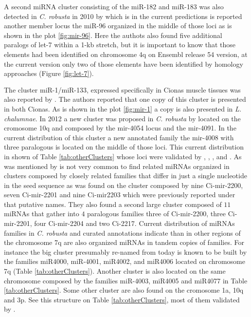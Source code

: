 \documentclass[graybox]{svmult}
\begin{document}
A second miRNA cluster consisting of the miR-182 and miR-183 was also detected 
in \textit{C. robusta} in 2010 by \cite{Keshavan2010} which is in the 
current predictions is reported another member locus the miR-96 organized in 
the 
middle of those loci as is shown in the plot \ref{fig:mir-96}. 
Here the authots also found five additional paralogs of let-7 within a 1-kb 
stretch, but it is important to know that those elements had been identified on 
chromosome 4q on Ensembl release 54 version, at the current version only 
two of those elements have been identified by homology approaches (Figure 
\ref{fig:let-7}).

The cluster miR-1/miR-133, expressed specifically in Cionas muscle tissues was 
also reported by \cite{Kusakabe2013}. The authors reported that one copy of 
this cluster is presented in both Cionas. As is shown in the plot 
\ref{fig:mir-1} a copy is also presented in \textit{L. chalumnae}. In 2012 a 
new cluster was proposed in \textit{C. robusta} by \cite{Terai2012} located 
on the cromosome 10q and composed by the mir-4054 locus and the mir-4091. In 
the current distribution of this cluster a new annotated family the mir-4008 
with three paralogous is located on the middle of those loci. This current 
distribution in shown of Table \ref{tab:otherClusters} whose loci were  
validated by \cite{Norden-Krichmar2007}, \cite{Fu2008}, \cite{Hendrix2010}, and 
\cite{Terai2012}. As was mentioned by \cite{Hendrix2010} is not very common to 
find related miRNAs organized in clusters composed by closely related families 
that differ in just a single nucleotide in the seed sequence as was found on 
the cluster composed by nine Ci-mir-2200, seven Ci-mir-2201 and nine Ci-mir2203 
which were previously reported under that putative names. They also found a 
second large cluster composed of $11$ miRNAs that gather into $4$ paralogous 
families three of Ci-mir-2200, three Ci-mir-2201, four Ci-mir-2204 and two 
Ci-2217. Current distribution of miRNAs families in \textit{C. robusta} and 
curated annotations indicate than in other regions of the chromosome 7q are 
also organized miRNAs in tandem copies of families. For instance the big 
cluster presumably re-named from \cite{Hendrix2010} today is known to be built 
by the families miR4000, miR-4001, miR4002, and miR4006 located on chromosome 
7q (Table \ref{tab:otherClusters}). Another cluster is also located on the same 
chromosome composed by the families miR-4003, miR4005 and miR4077 in Table 
\ref{tab:otherClusters}. Some other cluster are also found on the cromosome 1a, 
10q and 3p. See this structure on Table \ref{tab:otherClusters}, most 
of them validated by \cite{Hendrix2010}. 
\end{document}
